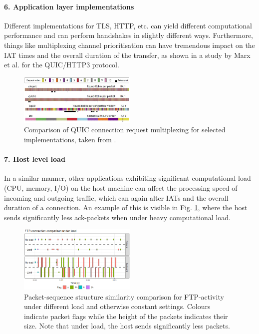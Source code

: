 \documentclass[sigconf]{acmart}
\begin{document}
\paragraph{6. Application layer implementations}
Different implementations for TLS, HTTP, etc. can yield different computational performance and can perform handshakes in slightly different ways. Furthermore, things like multiplexing channel prioritisation can have tremendous impact on the IAT times and the overall duration of the transfer, as shown in a study by Marx et al.  \cite{marx2020same} for the QUIC/HTTP3 protocol.


\begin{figure}
\centering
\includegraphics[width=0.5\textwidth]{images/Proto_differences_small.png}
\caption{Comparison of QUIC connection request multiplexing for selected implementations, taken from \cite{marx2020same}.}
\end{figure}


\paragraph{7. Host level load}
In a similar manner, other applications exhibiting significant computational load (CPU, memory, I/O) on the host machine can affect the processing speed of incoming and outgoing traffic, which can again alter IATs and the  overall duration of a connection. An example of this is visible in Fig. \ref{Fig:FTP_load}, where the host sends significantly less ack-packets when under heavy computational load. 

\begin{figure}
\centering
\includegraphics[width=0.5\textwidth]{images/FTP_load.png}
\caption{Packet-sequence structure similarity comparison for FTP-activity under different load and otherwise constant settings. Colours indicate packet flags while the height of the packets indicates their size. Note that under load, the host sends significantly less packets.}\label{Fig:FTP_load}
\end{figure}
\end{document}
